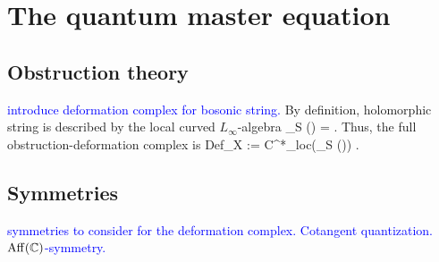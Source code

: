 \documentclass[10pt]{amsart}
\def\brian{\textcolor{blue}}
\begin{document}
\section{The quantum master equation}
\subsection{Obstruction theory}
\brian{introduce deformation complex for bosonic string.}
By definition, holomorphic string is described by the local curved
$L_\infty$-algebra 
\ben
{}_S (\cL \ltimes \cE) =  .
\een 
Thus, the full obstruction-deformation complex is
\ben
{\rm Def}_X := C^*_{\rm loc}(_S (\cL \ltimes \cE)) .
\een 
\subsection{Symmetries}
\brian{symmetries to consider for the deformation complex. Cotangent
  quantization. ${\rm Aff}(\mathbb C)$-symmetry. }
\end{document}
